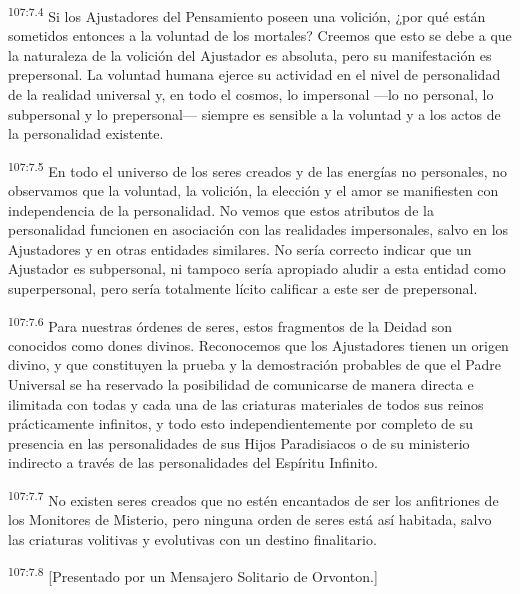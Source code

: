 \documentclass[twoside, 11pt]{book}
\begin{document}
\par
\textsuperscript{107:7.4} Si los Ajustadores del Pensamiento poseen una volición, ¿por qué están sometidos entonces a la voluntad de los mortales? Creemos que esto se debe a que la naturaleza de la volición del Ajustador es absoluta, pero su manifestación es prepersonal. La voluntad humana ejerce su actividad en el nivel de personalidad de la realidad universal y, en todo el cosmos, lo impersonal ---lo no personal, lo subpersonal y lo prepersonal--- siempre es sensible a la voluntad y a los actos de la personalidad existente.

\par
\textsuperscript{107:7.5} En todo el universo de los seres creados y de las energías no personales, no observamos que la voluntad, la volición, la elección y el amor se manifiesten con independencia de la personalidad. No vemos que estos atributos de la personalidad funcionen en asociación con las realidades impersonales, salvo en los Ajustadores y en otras entidades similares. No sería correcto indicar que un Ajustador es subpersonal, ni tampoco sería apropiado aludir a esta entidad como superpersonal, pero sería totalmente lícito calificar a este ser de prepersonal.

\par
\textsuperscript{107:7.6} Para nuestras órdenes de seres, estos fragmentos de la Deidad son conocidos como dones divinos. Reconocemos que los Ajustadores tienen un origen divino, y que constituyen la prueba y la demostración probables de que el Padre Universal se ha reservado la posibilidad de comunicarse de manera directa e ilimitada con todas y cada una de las criaturas materiales de todos sus reinos prácticamente infinitos, y todo esto independientemente por completo de su presencia en las personalidades de sus Hijos Paradisiacos o de su ministerio indirecto a través de las personalidades del Espíritu Infinito.

\par
\textsuperscript{107:7.7} No existen seres creados que no estén encantados de ser los anfitriones de los Monitores de Misterio, pero ninguna orden de seres está así habitada, salvo las criaturas volitivas y evolutivas con un destino finalitario.

\par
\textsuperscript{107:7.8} [Presentado por un Mensajero Solitario de Orvonton.]
\end{document}
